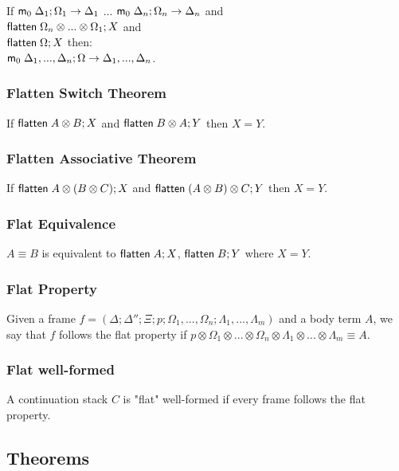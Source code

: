 If $\mathsf{m}_0 \; \Delta_1; \Omega_1 \rightarrow \Delta_1$ ... $\mathsf{m}_0 \; \Delta_n; \Omega_n \rightarrow \Delta_n$ and\\
$\mathsf{flatten} \; \Omega_n \otimes ... \otimes \Omega_1; X$ and \\
$\mathsf{flatten} \; \Omega; X$ then:\\
$\mathsf{m}_0 \; \Delta_1, ..., \Delta_n; \Omega \rightarrow \Delta_1, ..., \Delta_n$.

\subsubsection{Flatten Switch Theorem}

If $\mathsf{flatten} \; A \otimes B; X$ and $\mathsf{flatten} \; B \otimes A; Y$ then $X = Y$.

\subsubsection{Flatten Associative Theorem}

If $\mathsf{flatten} \; A \otimes (B \otimes C); X$ and $\mathsf{flatten} \; (A \otimes B) \otimes C; Y$ then $X = Y$.

\subsubsection{Flat Equivalence}

\newcommand{\feq}[2]{#1 \equiv #2}

$\feq{A}{B}$ is equivalent to $\mathsf{flatten} \; A; X$, $\mathsf{flatten} \; B; Y$ where $X = Y$.

\subsubsection{Flat Property}

Given a frame $f = (\Delta; \Delta''; \Xi; p; \Omega_1, ..., \Omega_n; \Lambda_1, ..., \Lambda_m)$ and a body term $A$, we say that $f$ follows the flat property if $\feq{p \otimes \Omega_1 \otimes ... \otimes \Omega_n \otimes \Lambda_1 \otimes ... \otimes \Lambda_m}{A}$.

\subsubsection{Flat well-formed}

A continuation stack $C$ is "flat" well-formed if every frame follows the flat property.

\subsection{Theorems}

